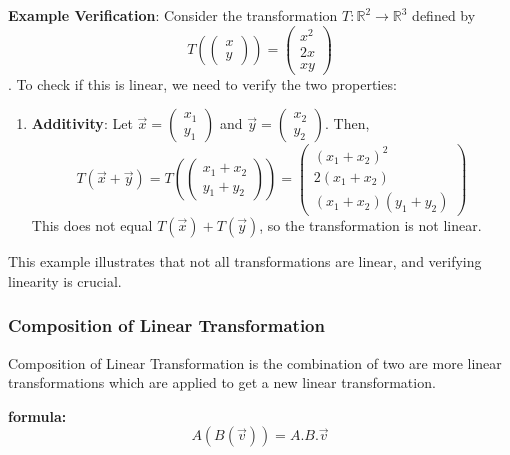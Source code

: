 \documentclass[11pt]{article}
\providecommand{\tightlist}{%
      \setlength{\itemsep}{0pt}\setlength{\parskip}{0pt}}
\begin{document}
\textbf{Example Verification}: Consider the transformation
\(T: \mathbb{R}^2 \to \mathbb{R}^3\) defined by
\[T\left(\begin{pmatrix} x \\ y \end{pmatrix}\right) = \begin{pmatrix} x^2 \\ 2x \\ xy \end{pmatrix}\].
To check if this is linear, we need to verify the two properties:

\begin{enumerate}
\def\labelenumi{\arabic{enumi}.}
\tightlist
\item
  \textbf{Additivity}: Let
  \(\vec{x} = \begin{pmatrix} x_1 \\ y_1 \end{pmatrix}\) and
  \(\vec{y} = \begin{pmatrix} x_2 \\ y_2 \end{pmatrix}\). Then, \[
  T(\vec{x} + \vec{y}) = T\left(\begin{pmatrix} x_1 + x_2 \\ y_1 + y_2 \end{pmatrix}\right) = \begin{pmatrix} (x_1 + x_2)^2 \\ 2(x_1 + x_2) \\ (x_1 + x_2)(y_1 + y_2) \end{pmatrix}
  \] This does not equal \(T(\vec{x}) + T(\vec{y})\), so the
  transformation is not linear.
\end{enumerate}

This example illustrates that not all transformations are linear, and
verifying linearity is crucial.

    \hypertarget{composition-of-linear-transformation}{%
\subsubsection{\texorpdfstring{\textbf{Composition of Linear
Transformation}}{Composition of Linear Transformation}}\label{composition-of-linear-transformation}}

    Composition of Linear Transformation is the combination of two are more
linear transformations which are applied to get a new linear
transformation.

\textbf{formula:} \[ A(B(\vec{v})) = A.B.\vec{v} \]
\end{document}
